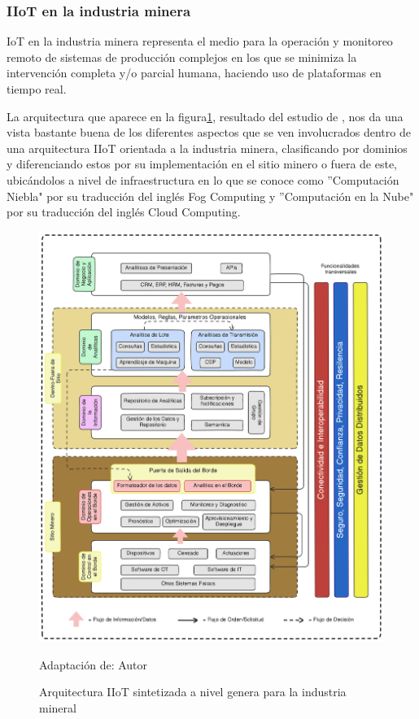 \documentclass[stu,12pt,floatsintext]{apa7}
\begin{document}
	\subsubsection{IIoT en la industria minera}
	IoT en la industria minera representa el medio para la operación y monitoreo remoto de sistemas de producción complejos en los que se minimiza la intervención completa y/o parcial humana, haciendo uso de plataformas en tiempo real\cite{molaei:hal-02940030}.
	
	La arquitectura que aparece en la figura\ref{iiot_minas_arq_sintetizada}, resultado del estudio de  \cite{iot1020029}, nos da una vista bastante buena de los diferentes aspectos que se ven involucrados dentro de una arquitectura IIoT orientada a la industria minera, clasificando por dominios y diferenciando estos por su implementación en el sitio minero o fuera de este, ubicándolos a nivel de infraestructura en lo que se conoce como ''Computación Niebla" por su traducción del inglés Fog Computing y ''Computación en la Nube" por su traducción del inglés Cloud Computing.
		\begin{figure}[H]
		\centering
		\includegraphics[scale=0.13]{Adaptacion_Synthesized_high_level_IIoT_architecture_for_mining_industry.png}
		\captionsetup{justification=centering}
		\caption{Arquitectura IIoT sintetizada a nivel genera para la industria mineral}
		\small
		\label{iiot_minas_arq_sintetizada}
		Adaptación de: Autor
	\end{figure}
\end{document}
